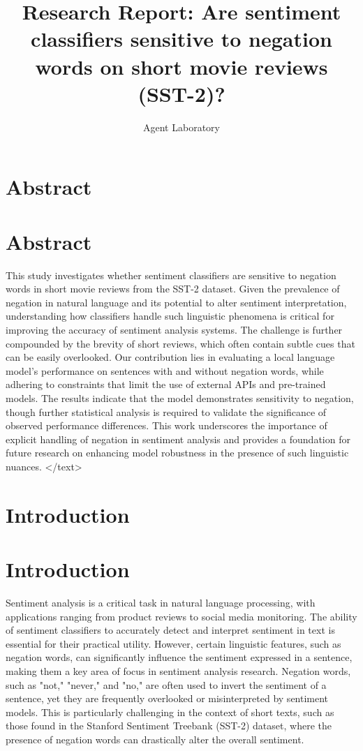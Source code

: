 \documentclass{article}
\title{Research Report: Are sentiment classifiers sensitive to negation words on short movie reviews (SST-2)?}
\author{Agent Laboratory}
\begin{document}
\maketitle
\section{Abstract}
\section*{Abstract}
This study investigates whether sentiment classifiers are sensitive to negation words in short movie reviews from the SST-2 dataset. Given the prevalence of negation in natural language and its potential to alter sentiment interpretation, understanding how classifiers handle such linguistic phenomena is critical for improving the accuracy of sentiment analysis systems. The challenge is further compounded by the brevity of short reviews, which often contain subtle cues that can be easily overlooked. Our contribution lies in evaluating a local language model's performance on sentences with and without negation words, while adhering to constraints that limit the use of external APIs and pre-trained models. The results indicate that the model demonstrates sensitivity to negation, though further statistical analysis is required to validate the significance of observed performance differences. This work underscores the importance of explicit handling of negation in sentiment analysis and provides a foundation for future research on enhancing model robustness in the presence of such linguistic nuances.
</text>
\section{Introduction}
\section*{Introduction}

Sentiment analysis is a critical task in natural language processing, with applications ranging from product reviews to social media monitoring. The ability of sentiment classifiers to accurately detect and interpret sentiment in text is essential for their practical utility. However, certain linguistic features, such as negation words, can significantly influence the sentiment expressed in a sentence, making them a key area of focus in sentiment analysis research. Negation words, such as "not," "never," and "no," are often used to invert the sentiment of a sentence, yet they are frequently overlooked or misinterpreted by sentiment models. This is particularly challenging in the context of short texts, such as those found in the Stanford Sentiment Treebank (SST-2) dataset, where the presence of negation words can drastically alter the overall sentiment.
\end{document}
